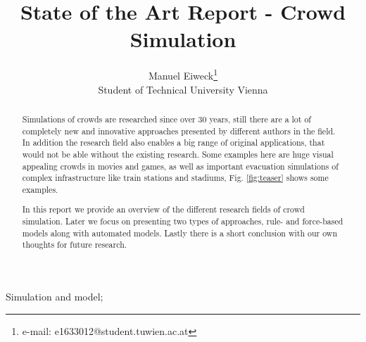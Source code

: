 \documentclass{acmsiggraph}               %
\title{State of the Art Report - Crowd Simulation}
\author{Manuel Eiweck\thanks{e-mail: e1633012@student.tuwien.ac.at}\\ Student of Technical University Vienna}
\begin{document}


\maketitle


\begin{abstract}
Simulations of crowds are researched since over 30 years, still there are a lot of completely new and innovative approaches presented by different authors in the field. In addition the research field also enables a big range of original applications, that would not be able without the existing research. Some examples here are huge visual appealing crowds in movies and games, as well as important evacuation simulations of complex infrastructure like train stations and stadiums, Fig. \ref{fig:teaser} shows some examples.

In this report we provide an overview of the different research fields of crowd simulation. Later we focus on presenting two types of approaches, rule- and force-based models along with automated models. Lastly there is a short conclusion with our own thoughts for future research.

\end{abstract}


\begin{CRcatlist}
{Simulation and model}{};
\end{CRcatlist}
\end{document}
